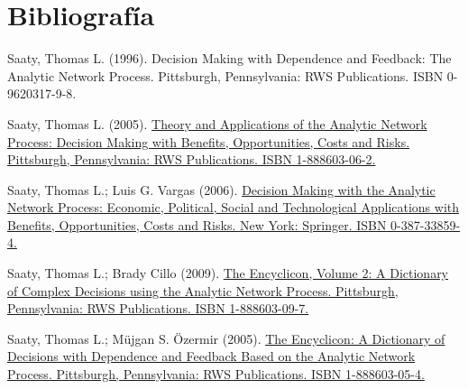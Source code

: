 \documentclass[12pt,twocolumn]{article}
\begin{document}
\section{Bibliografía}
\itemize
\item Saaty, Thomas L. (1996). Decision Making with Dependence and Feedback: The Analytic Network Process. Pittsburgh, Pennsylvania: RWS Publications. ISBN 0-9620317-9-8.
\item Saaty, Thomas L. (2005). \href{http://www.amazon.com/dp/1888603062}{Theory and Applications of the Analytic Network Process: Decision Making with Benefits, Opportunities, Costs and Risks. Pittsburgh, Pennsylvania: RWS Publications. ISBN 1-888603-06-2.}
\item Saaty, Thomas L.; Luis G. Vargas (2006). \href{http://www.amazon.com/dp/0387338594}{Decision Making with the Analytic Network Process: Economic, Political, Social and Technological Applications with Benefits, Opportunities, Costs and Risks. New York: Springer. ISBN 0-387-33859-4.}
\item Saaty, Thomas L.; Brady Cillo (2009). \href{http://rwspublications.com/}{The Encyclicon, Volume 2: A Dictionary of Complex Decisions using the Analytic Network Process. Pittsburgh, Pennsylvania: RWS Publications. ISBN 1-888603-09-7.}
\item Saaty, Thomas L.; Müjgan S. Özermir (2005). \href{http://www.amazon.com/dp/1888603054}{The Encyclicon: A Dictionary of Decisions with Dependence and Feedback Based on the Analytic Network Process. Pittsburgh, Pennsylvania: RWS Publications. ISBN 1-888603-05-4.}
\end{document}
